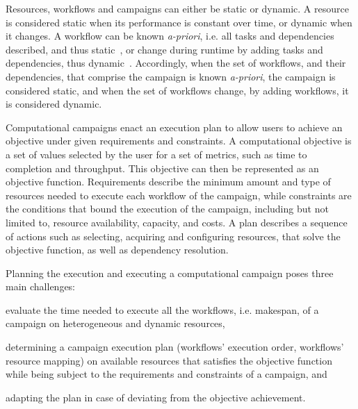 Resources, workflows and campaigns can either be static or dynamic. A resource is considered static when its performance is constant over time, or dynamic when it changes. A workflow can be known \textit{a-priori}, i.e. all tasks and dependencies described, and thus static~\cite{paraskevakos2019workflow}, or change during runtime by adding tasks and dependencies, thus dynamic~\cite{dakka2018high}. Accordingly, when the set of workflows, and their dependencies, that comprise the campaign is known \textit{a-priori}, the campaign is considered static, and when the set of workflows change, by adding workflows, it is considered dynamic.

Computational campaigns enact an execution plan to allow users to achieve an objective under given requirements and constraints. A computational objective is a set of values selected by the user for a set of metrics, such as time to completion and throughput. This objective can then be represented as an objective function. Requirements describe the minimum amount and type of resources needed to execute each workflow of the campaign, while constraints are the conditions that bound the execution of the campaign, including but not limited to, resource availability, capacity, and costs. A plan describes a sequence of actions such as selecting, acquiring and configuring resources, that solve the objective function, as well as dependency resolution.

Planning the execution and executing a computational campaign poses three main challenges: 
\begin{inparaenum}[(i)]
\item evaluate the time needed to execute all the workflows, i.e. makespan, of a campaign on heterogeneous and dynamic resources,
\item determining a campaign execution plan (workflows’ execution order, workflows’ resource mapping) on available resources that satisfies the objective function while being subject to the requirements and constraints of a campaign, and
\item adapting the plan in case of deviating from the objective achievement.
\end{inparaenum}


